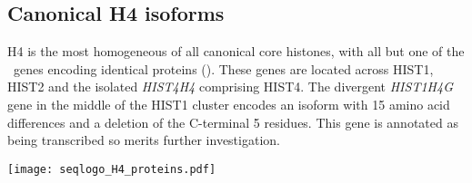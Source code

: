   \subsection{Canonical H4 isoforms}
    H4 is the most homogeneous of all canonical core histones,
    with all but one of the \HFourCodingGenes{}~genes encoding
    identical proteins ().
    These genes are located across HIST1, HIST2 and the isolated
    \textit{HIST4H4} comprising HIST4.
    The divergent \textit{HIST1H4G} gene in the middle of the HIST1 cluster
    encodes an isoform with 15 amino acid differences and a deletion of the C-terminal 5 residues.
    This gene is annotated as being transcribed so merits further investigation.

    \begin{table}
      \caption{%
        Canonical H4 protein isoforms.  Upper panel shows isoforms
        relative to the most common protein sequence.  Lower panel
        shows sequence logo of all isoforms aligned with invariant
        residues in grey.
      }
      \label{tab:H4-consensus}
      
      \texttt{[image: seqlogo\_H4\_proteins.pdf]}
    \end{table}
